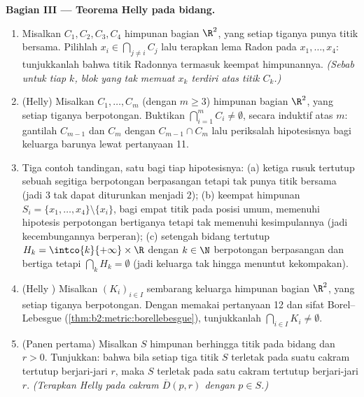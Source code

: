 \begin{problem}
\medskip
\noindent\textbf{Bagian III --- Teorema Helly pada bidang.}
\begin{enumerate}[resume]
  \item Misalkan $C_1, C_2, C_3, C_4$ himpunan bagian  $\R^2$,
        yang setiap tiganya punya titik bersama. Pilihlah $x_i \in
        \bigcap_{j \neq i} C_j$ lalu terapkan lema Radon pada
        $x_1, \dots, x_4$: tunjukkanlah bahwa titik Radonnya termasuk
        keempat himpunannya. \emph{(Sebab untuk tiap $k$, blok yang tak
        memuat $x_k$ terdiri atas titik $C_k$.)}
  \item (Helly) Misalkan $C_1, \dots, C_m$ (dengan $m \geq 3$) himpunan bagian
         $\R^2$, yang setiap tiganya berpotongan.
        Buktikan $\bigcap_{i=1}^m C_i \neq \emptyset$, secara
        induktif atas $m$: gantilah $C_{m-1}$ dan $C_m$ dengan
        $C_{m-1} \cap C_m$ lalu periksalah hipotesisnya bagi
        keluarga barunya lewat pertanyaan 11.
  \item Tiga contoh tandingan, satu bagi tiap hipotesisnya: (a) ketiga
        rusuk tertutup sebuah segitiga berpotongan berpasangan
        tetapi tak punya titik bersama (jadi $3$ tak dapat diturunkan menjadi
        $2$); (b) keempat himpunan $S_i = \{x_1, \dots, x_4\}
        \setminus \{x_i\}$, bagi empat titik pada posisi umum,
        memenuhi hipotesis perpotongan bertiganya
        tetapi tak memenuhi kesimpulannya (jadi kecembungannya berperan); (c)
        setengah bidang tertutup $H_k = \intco{k}{+\infty} \times
        \R$ dengan $k \in \N$ berpotongan berpasangan dan bertiga
        tetapi $\bigcap_k H_k = \emptyset$ (jadi keluarga tak hingga
        menuntut kekompakan).
  \item (Helly ) Misalkan $(K_i)_{i \in I}$ sembarang
        keluarga himpunan bagian   $\R^2$, yang setiap tiganya
        berpotongan. Dengan memakai pertanyaan 12 dan sifat
        Borel--Lebesgue
        (\cref{thm:b2:metric:borellebesgue}), tunjukkanlah
        $\bigcap_{i \in I} K_i \neq \emptyset$.
  \item (Panen pertama) Misalkan $S$ himpunan berhingga titik pada
        bidang dan $r > 0$. Tunjukkan: bahwa bila setiap tiga titik
        $S$ terletak pada suatu cakram tertutup berjari-jari $r$, maka $S$
        terletak pada satu cakram tertutup berjari-jari $r$. \emph{(Terapkan
        Helly pada cakram $\overline D(p, r)$ dengan $p \in S$.)}
\end{enumerate}


\end{problem}
